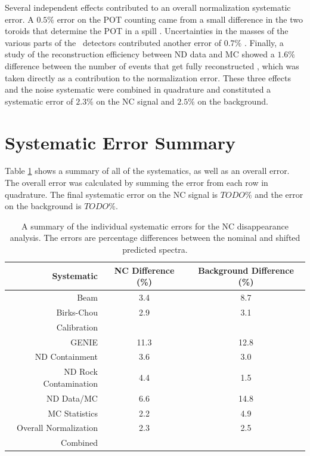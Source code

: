 Several independent effects contributed to an overall normalization systematic error. A $0.5\%$ error on the POT counting came from a small difference in the two toroids that determine the POT in a spill \cite{ref:TNBeam}. Uncertainties in the masses of the various parts of the \nova~detectors contributed another error of $0.7\%$ \cite{ref:MassError}. Finally, a study of the reconstruction efficiency between ND data and MC showed a $1.6\%$ difference between the number of events that get fully reconstructed \cite{ref:NDDataMCRecoEff}, which was taken directly as a contribution to the normalization error. These three effects and the noise systematic were combined in quadrature and constituted a systematic error of $2.3\%$ on the NC signal and $2.5\%$ on the background.

\section{Systematic Error Summary}

Table \ref{tab:SystSummary} shows a summary of all of the systematics, as well as an overall error. The overall error was calculated by summing the error from each row in quadrature. The final systematic error on the NC signal is $TODO\%$ and the error on the background is $TODO\%$.
\begin{table}[h]
  \begin{center}
    \caption[Systematic Error Summary]{A summary of the individual systematic errors for the NC disappearance analysis. The errors are percentage differences between the nominal and shifted predicted spectra.}
    \label{tab:SystSummary}
    \begin{tabular}{r c c}
      \hline\hline
      Systematic & NC Difference (\%) & Background Difference (\%) \\
      \hline
      Beam & 3.4 & 8.7 \\
      Birks-Chou & 2.9 & 3.1 \\
      Calibration & & \\
      GENIE & 11.3 & 12.8 \\
      ND Containment & 3.6 & 3.0 \\
      ND Rock Contamination & 4.4 & 1.5 \\
      ND Data/MC & 6.6 & 14.8 \\
      MC Statistics & 2.2 & 4.9 \\
      Overall Normalization & 2.3 & 2.5 \\
      \hline
      Combined & & \\
      \hline
    \end{tabular}
  \end{center}
\end{table}

